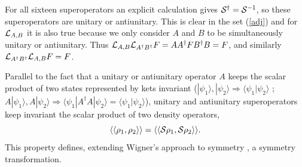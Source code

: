 {For all sixteen superoperators an explicit calculation gives  ${\cal{S}}^{\dagger}={\cal{S}}^{-1}$, so these superoperators are  unitary or antiunitary. This is clear in the set (\ref{adj}) and  for ${\cal{L}}_{A,B}$ it  is also true because we only consider $A$ and $B$ to be simultaneously unitary or antiunitary. Thus  ${\cal{L}}_{A,B}{\cal{L}}_{A^{\dagger}B^{\dagger}}F=AA^{\dagger}FB^{\dagger}B=F$,
and similarly ${\cal{L}}_{A^{\dagger}B^{\dagger}}{\cal{L}}_{A,B}F=F$.


Parallel to the fact that a unitary or antiunitary operator $A$ keeps the scalar product of two states represented by kets invariant ($|\psi_{1}\rangle,|\psi_{2}\rangle \Rightarrow \langle\psi_{1}|\psi_{2}\rangle$ ;\linebreak $A|\psi_{1}\rangle,A|\psi_{2}\rangle \Rightarrow \langle\psi_{1}|A^{\dagger}A|\psi_{2}\rangle=\langle\psi_{1}|\psi_{2}\rangle$), unitary and antiunitary superoperators keep  invariant the scalar product of two density operators,
%
\begin{equation}
\langle\langle \rho_{1},\rho_{2}\rangle\rangle=\langle\langle {\cal{S}}\rho_{1},{\cal{S}}\rho_{2} \rangle\rangle.
\end{equation}
%
This property defines, extending Wigner's approach to symmetry \cite{Zee2016}, a symmetry transformation.







}
